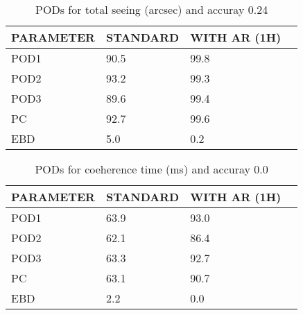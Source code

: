 \documentclass[11pt,english]{article}
\begin{document}
\begin{table}[]
\begin{center}
\begin{tabular}{|l|l|l|l|}
\hline
\multicolumn{1}{|c|}{\cellcolor[HTML]{C0C0C0}\textbf{PARAMETER}} & \multicolumn{1}{c|}{\cellcolor[HTML]{C0C0C0}\textbf{STANDARD}} & \multicolumn{1}{c|}{\cellcolor[HTML]{C0C0C0}\textbf{WITH AR (1H)}} \\
\hline
\cellcolor[HTML]{C0C0C0}POD1  & 90.5                                & 99.8         \\
\cellcolor[HTML]{C0C0C0}POD2  & 93.2                                & 99.3         \\
\cellcolor[HTML]{C0C0C0}POD3  & 89.6                                & 99.4         \\
\cellcolor[HTML]{C0C0C0}PC    & 92.7                                  & 99.6           \\
\cellcolor[HTML]{C0C0C0}EBD   & 5.0                                 & 0.2          \\
\hline
\end{tabular}
\caption{PODs for total seeing (arcsec) and accuray 0.24}
\end{center}
\end{table}
\begin{table}[]
\begin{center}
\begin{tabular}{|l|l|l|l|}
\hline
\multicolumn{1}{|c|}{\cellcolor[HTML]{C0C0C0}\textbf{PARAMETER}} & \multicolumn{1}{c|}{\cellcolor[HTML]{C0C0C0}\textbf{STANDARD}} & \multicolumn{1}{c|}{\cellcolor[HTML]{C0C0C0}\textbf{WITH AR (1H)}} \\
\hline
\cellcolor[HTML]{C0C0C0}POD1  & 63.9                                & 93.0         \\
\cellcolor[HTML]{C0C0C0}POD2  & 62.1                                & 86.4         \\
\cellcolor[HTML]{C0C0C0}POD3  & 63.3                                & 92.7         \\
\cellcolor[HTML]{C0C0C0}PC    & 63.1                                  & 90.7           \\
\cellcolor[HTML]{C0C0C0}EBD   & 2.2                                 & 0.0          \\
\hline
\end{tabular}
\caption{PODs for coeherence time (ms) and accuray 0.0}
\end{center}
\end{table}
\end{document}
